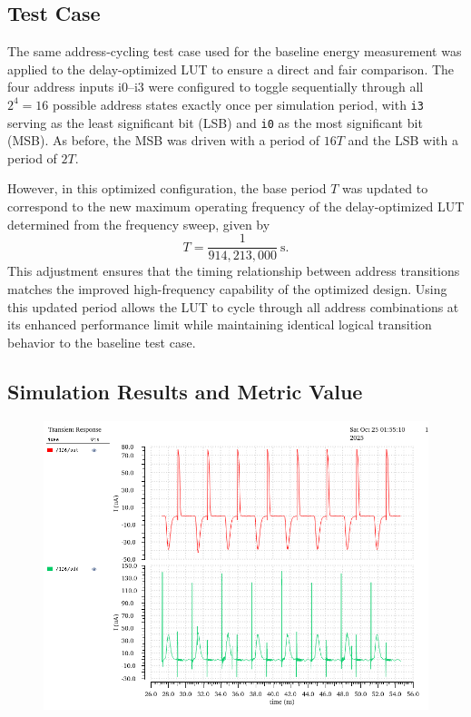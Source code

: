\documentclass[12pt]{article}
\begin{document}
\newpage

\subsection{Test Case}
The same address-cycling test case used for the baseline energy measurement was applied to the delay-optimized LUT to ensure a direct and fair comparison. The four address inputs i0–i3 were configured to toggle sequentially through all $2^4 = 16$ possible address states exactly once per simulation period, with \texttt{i3} serving as the least significant bit (LSB) and \texttt{i0} as the most significant bit (MSB). As before, the MSB was driven with a period of $16T$ and the LSB with a period of $2T$.

However, in this optimized configuration, the base period $T$ was updated to correspond to the new maximum operating frequency of the delay-optimized LUT determined from the frequency sweep, given by 
\[
T = \frac{1}{914{,}213{,}000}~\text{s}.
\]
This adjustment ensures that the timing relationship between address transitions matches the improved high-frequency capability of the optimized design. Using this updated period allows the LUT to cycle through all address combinations at its enhanced performance limit while maintaining identical logical transition behavior to the baseline test case.


\newpage

\subsection{Simulation Results and Metric Value}

\begin{figure}[H]
    \centering
    \includegraphics[width=0.8\linewidth]{writeup//figures/optimized_energy_currents.png}
    \caption{}
\end{figure}
\end{document}
